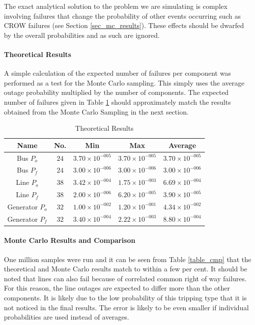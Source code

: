 \documentclass[a4paper,oneside,12pt]{report}
\begin{document}
The exact analytical solution to the problem we are simulating is
complex involving failures that change the probability of other events
occurring such as CROW failures (see Section \ref{sec_mc_results}). These effects should be dwarfed by the overall
probabilities and as such are ignored.

\paragraph{Theoretical Results}

A simple calculation of the expected number of failures per component was performed as a test for the Monte Carlo sampling. This simply uses the average outage probability multiplied by the number of components. The expected number of failures given in Table \ref{table_theo} should approximately match the results obtained from the Monte Carlo Sampling in the next section.

\begin{table}[!t]
\renewcommand{\arraystretch}{1.3}
\caption{Theoretical Results}
\label{table_theo}
\centering
\begin{tabular}{c||c||c||c||c}
\bfseries Name & \bfseries No. & \bfseries Min & \bfseries Max & \bfseries Average\\
\hline\hline
Bus $P_o$	& $24$ & $3.70 \times 10^{-005}$ & $3.70 \times 10^{-005}$ & $3.70 \times 10^{-005}$ \\
Bus $P_f$	& $24$ & $3.00 \times 10^{-006}$ & $3.00 \times 10^{-006}$ & $3.00 \times 10^{-006}$ \\
Line $P_o$	& $38$ & $3.42 \times 10^{-004}$ & $1.75 \times 10^{-003}$ & $6.69 \times 10^{-004}$ \\
Line $P_f$	& $38$ & $2.00 \times 10^{-006}$ & $6.20 \times 10^{-005}$ & $3.90 \times 10^{-005}$	 \\
Generator $P_o$ & $32$ & $1.00 \times 10^{-002}$ & $1.20 \times 10^{-001}$ & $4.34 \times 10^{-002}$ \\
Generator $P_f$ & $32$ & $3.40 \times 10^{-004}$ & $2.22 \times 10^{-003}$ & $8.80 \times 10^{-004}$ \\
\hline
\end{tabular}
\end{table}

\paragraph{Monte Carlo Results and Comparison}

One million samples were run and it can be seen from Table \ref{table_cmp} that the theoretical and Monte Carlo results match to within a few per cent. It should be noted that lines can also fail because of correlated common right of way failures. For this reason, the line outages are expected to differ more than the other components. It is likely due to the low probability of this tripping type that it is not noticed in the final results. The error is likely to be even smaller if individual probabilities are used instead of averages.
\end{document}
